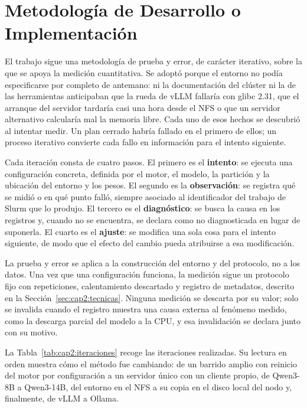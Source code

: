 \section{Metodología de Desarrollo o Implementación}
\label{sec:cap2:metodologia}

El trabajo sigue una metodología de prueba y error, de carácter iterativo, sobre la que se apoya la medición cuantitativa. Se adoptó porque el entorno no podía especificarse por completo de antemano: ni la documentación del clúster ni la de las herramientas anticipaban que la rueda de vLLM fallaría con glibc 2.31, que el arranque del servidor tardaría casi una hora desde el NFS o que un servidor alternativo calcularía mal la memoria libre. Cada uno de esos hechos se descubrió al intentar medir. Un plan cerrado habría fallado en el primero de ellos; un proceso iterativo convierte cada fallo en información para el intento siguiente.

Cada iteración consta de cuatro pasos. El primero es el \textbf{intento}: se ejecuta una configuración concreta, definida por el motor, el modelo, la partición y la ubicación del entorno y los pesos. El segundo es la \textbf{observación}: se registra qué se midió o en qué punto falló, siempre asociado al identificador del trabajo de Slurm que lo produjo. El tercero es el \textbf{diagnóstico}: se busca la causa en los registros y, cuando no se encuentra, se declara como no diagnosticada en lugar de suponerla. El cuarto es el \textbf{ajuste}: se modifica una sola cosa para el intento siguiente, de modo que el efecto del cambio pueda atribuirse a esa modificación.

La prueba y error se aplica a la construcción del entorno y del protocolo, no a los datos. Una vez que una configuración funciona, la medición sigue un protocolo fijo con repeticiones, calentamiento descartado y registro de metadatos, descrito en la Sección~\ref{sec:cap2:tecnicas}. Ninguna medición se descarta por su valor; solo se invalida cuando el registro muestra una causa externa al fenómeno medido, como la descarga parcial del modelo a la CPU, y esa invalidación se declara junto con su motivo.

La Tabla~\ref{tab:cap2:iteraciones} recoge las iteraciones realizadas. Su lectura en orden muestra cómo el método fue cambiando: de un barrido amplio con reinicio del motor por configuración a un servidor único con un cliente propio, de Qwen3-8B a Qwen3-14B, del entorno en el NFS a su copia en el disco local del nodo y, finalmente, de vLLM a Ollama.

